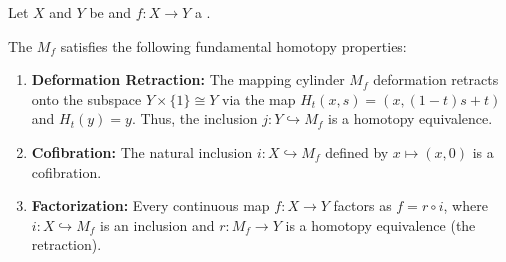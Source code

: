 \begin{proposition} \label{proposition:homotopy_properties_of_mapping_cylinder}
Let $X$ and $Y$ be  and $f: X \to Y$ a . 

The  $M_f$ satisfies the following fundamental homotopy properties:
\begin{enumerate}
    \item \textbf{Deformation Retraction:} The mapping cylinder $M_f$ deformation retracts onto the subspace $Y \times \{1\} \cong Y$ via the map $H_t(x, s) = (x, (1-t)s + t)$ and $H_t(y) = y$. Thus, the inclusion $j: Y \hookrightarrow M_f$ is a homotopy equivalence.
    \item \textbf{Cofibration:} The natural inclusion $i: X \hookrightarrow M_f$ defined by $x \mapsto (x, 0)$ is a cofibration.
    \item \textbf{Factorization:} Every continuous map $f: X \to Y$ factors as $f = r \circ i$, where $i: X \hookrightarrow M_f$ is an inclusion and $r: M_f \to Y$ is a homotopy equivalence (the retraction).
\end{enumerate}
\end{proposition}